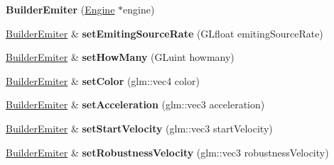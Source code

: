 \begin{DoxyCompactItemize}
\item 
{\bfseries Builder\+Emiter} (\hyperlink{classflw_1_1Engine}{Engine} $\ast$engine)\hypertarget{classflw_1_1flf_1_1BuilderEmiter_ae0eee2b4840fa09408e0e7eead1dc694}{}\label{classflw_1_1flf_1_1BuilderEmiter_ae0eee2b4840fa09408e0e7eead1dc694}

\item 
\hyperlink{classflw_1_1flf_1_1BuilderEmiter}{Builder\+Emiter} \& {\bfseries set\+Emiting\+Source\+Rate} (G\+Lfloat emiting\+Source\+Rate)\hypertarget{classflw_1_1flf_1_1BuilderEmiter_a554c839b5c60595e4b1d04d9d1b9095b}{}\label{classflw_1_1flf_1_1BuilderEmiter_a554c839b5c60595e4b1d04d9d1b9095b}

\item 
\hyperlink{classflw_1_1flf_1_1BuilderEmiter}{Builder\+Emiter} \& {\bfseries set\+How\+Many} (G\+Luint howmany)\hypertarget{classflw_1_1flf_1_1BuilderEmiter_af64e3d7700f5e12fc976ea90aa518071}{}\label{classflw_1_1flf_1_1BuilderEmiter_af64e3d7700f5e12fc976ea90aa518071}

\item 
\hyperlink{classflw_1_1flf_1_1BuilderEmiter}{Builder\+Emiter} \& {\bfseries set\+Color} (glm\+::vec4 color)\hypertarget{classflw_1_1flf_1_1BuilderEmiter_a3ffc7c438025abc17b1e1d9bee723d60}{}\label{classflw_1_1flf_1_1BuilderEmiter_a3ffc7c438025abc17b1e1d9bee723d60}

\item 
\hyperlink{classflw_1_1flf_1_1BuilderEmiter}{Builder\+Emiter} \& {\bfseries set\+Acceleration} (glm\+::vec3 acceleration)\hypertarget{classflw_1_1flf_1_1BuilderEmiter_a6ca384523af8e0acdcf4bc92c19d3421}{}\label{classflw_1_1flf_1_1BuilderEmiter_a6ca384523af8e0acdcf4bc92c19d3421}

\item 
\hyperlink{classflw_1_1flf_1_1BuilderEmiter}{Builder\+Emiter} \& {\bfseries set\+Start\+Velocity} (glm\+::vec3 start\+Velocity)\hypertarget{classflw_1_1flf_1_1BuilderEmiter_a157e33bb34dd0d524c701be21342f5a9}{}\label{classflw_1_1flf_1_1BuilderEmiter_a157e33bb34dd0d524c701be21342f5a9}

\item 
\hyperlink{classflw_1_1flf_1_1BuilderEmiter}{Builder\+Emiter} \& {\bfseries set\+Robustness\+Velocity} (glm\+::vec3 robustness\+Velocity)\hypertarget{classflw_1_1flf_1_1BuilderEmiter_ab5fa5784fa08efb3b496efb4edbd44ca}{}\label{classflw_1_1flf_1_1BuilderEmiter_ab5fa5784fa08efb3b496efb4edbd44ca}


\end{DoxyCompactItemize}
